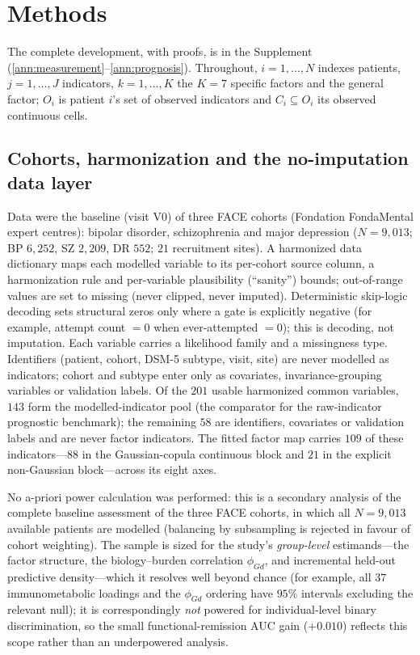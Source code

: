 \section{Methods}

The complete development, with proofs, is in the Supplement (\ref{ann:measurement}--\ref{ann:prognosis}). Throughout, $i=1,\dots,N$ indexes patients,
$j=1,\dots,J$ indicators, $k=1,\dots,K$ the $K=7$ specific factors and \Gfac{} the general
factor; $O_i$ is patient $i$'s set of observed indicators and $C_i\subseteq O_i$ its observed
continuous cells.

\subsection{Cohorts, harmonization and the no-imputation data layer}

Data were the baseline (visit V0) of three FACE cohorts (Fondation FondaMental expert
centres): bipolar disorder, schizophrenia and major depression ($N=9{,}013$; BP
$6{,}252$, SZ $2{,}209$, DR $552$; $21$ recruitment sites). A harmonized data
dictionary maps each modelled variable to its per-cohort source column, a
harmonization rule and per-variable plausibility (``sanity'') bounds; out-of-range
values are set to missing (never clipped, never imputed). Deterministic skip-logic
decoding sets structural zeros only where a gate is explicitly negative (for example,
attempt count $=0$ when ever-attempted $=0$); this is decoding, not imputation. Each
variable carries a likelihood family and a missingness type. Identifiers (patient,
cohort, DSM-5 subtype, visit, site) are never modelled as indicators; cohort and
subtype enter only as covariates, invariance-grouping variables or validation labels.
Of the $201$ usable harmonized common variables, $143$ form the modelled-indicator pool
(the comparator for the raw-indicator prognostic benchmark); the remaining $58$ are
identifiers, covariates or validation labels and are never factor indicators. The fitted
factor map carries $109$ of these indicators---$88$ in the Gaussian-copula continuous
block and $21$ in the explicit non-Gaussian block---across its eight axes.

No a-priori power calculation was performed: this is a secondary analysis of the complete
baseline assessment of the three FACE cohorts, in which all $N=9{,}013$ available patients are
modelled (balancing by subsampling is rejected in favour of cohort weighting). The sample is
sized for the study's \emph{group-level} estimands---the factor structure, the biology--burden
correlation $\phi_{Gd}$, and incremental held-out predictive density---which it resolves well
beyond chance (for example, all $37$ immunometabolic loadings and the $\phi_{Gd}$ ordering have
$95\%$ intervals excluding the relevant null); it is correspondingly \emph{not} powered for
individual-level binary discrimination, so the small functional-remission AUC gain ($+0.010$)
reflects this scope rather than an underpowered analysis.

